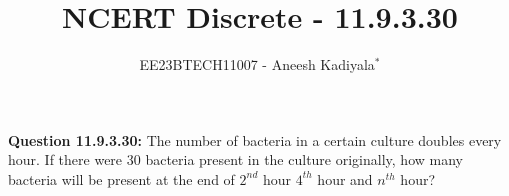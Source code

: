 \documentclass[journal,12pt,twocolumn]{IEEEtran}
\theoremstyle{remark}
\begin{document}

\vspace{3cm}

\title{NCERT Discrete - 11.9.3.30}
\author{EE23BTECH11007 - Aneesh Kadiyala$^{*}$%
}
\maketitle
\newpage
\bigskip

\renewcommand{\thefigure}{\theenumi}
\renewcommand{\thetable}{\theenumi}

\vspace{3cm}
\textbf{Question 11.9.3.30:} The number of bacteria in a certain culture doubles every hour. If there were 30 bacteria present in the culture originally, how many bacteria will be present at the end of $2^{nd}$ hour $4^{th}$ hour and $n^{th}$ hour?
\\
\solution
\end{document}
